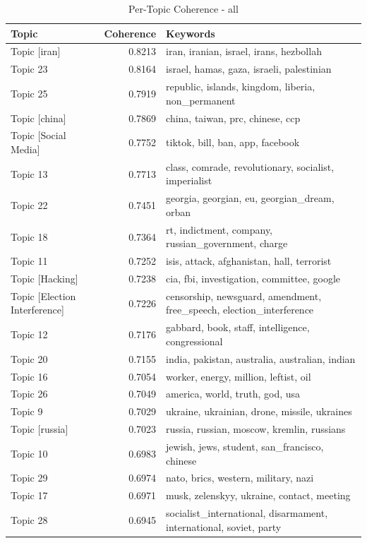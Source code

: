 \begin{table}
\centering
\small
\caption{Per-Topic Coherence - all}
\label{tab:topic_coherence_all}
\begin{tabular}{lrp{9cm}}
\toprule
Topic & Coherence & Keywords \\
\midrule
Topic [iran] & 0.8213 & iran, iranian, israel, irans, hezbollah \\
Topic 23 & 0.8164 & israel, hamas, gaza, israeli, palestinian \\
Topic 25 & 0.7919 & republic, islands, kingdom, liberia, non\_permanent \\
Topic [china] & 0.7869 & china, taiwan, prc, chinese, ccp \\
Topic [Social Media] & 0.7752 & tiktok, bill, ban, app, facebook \\
Topic 13 & 0.7713 & class, comrade, revolutionary, socialist, imperialist \\
Topic 22 & 0.7451 & georgia, georgian, eu, georgian\_dream, orban \\
Topic 18 & 0.7364 & rt, indictment, company, russian\_government, charge \\
Topic 11 & 0.7252 & isis, attack, afghanistan, hall, terrorist \\
Topic [Hacking] & 0.7238 & cia, fbi, investigation, committee, google \\
Topic [Election Interference] & 0.7226 & censorship, newsguard, amendment, free\_speech, election\_interference \\
Topic 12 & 0.7176 & gabbard, book, staff, intelligence, congressional \\
Topic 20 & 0.7155 & india, pakistan, australia, australian, indian \\
Topic 16 & 0.7054 & worker, energy, million, leftist, oil \\
Topic 26 & 0.7049 & america, world, truth, god, usa \\
Topic 9 & 0.7029 & ukraine, ukrainian, drone, missile, ukraines \\
Topic [russia] & 0.7023 & russia, russian, moscow, kremlin, russians \\
Topic 10 & 0.6983 & jewish, jews, student, san\_francisco, chinese \\
Topic 29 & 0.6974 & nato, brics, western, military, nazi \\
Topic 17 & 0.6971 & musk, zelenskyy, ukraine, contact, meeting \\
Topic 28 & 0.6945 & socialist\_international, disarmament, international, soviet, party \\

\end{tabular}
\end{table}
